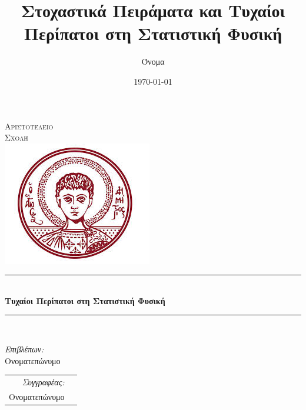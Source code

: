 \begin{titlepage}

\pagestyle{empty}
\title{Στοχαστικά Πειράματα και Τυχαίοι Περίπατοι στη Στατιστική Φυσική}
\author{Όνομα}
\date{\today}

\newcommand{\HRule}{\rule{\linewidth}{0.5mm}} %

\begin{center}
 

\textsc{Αριστοτέλειο}\\[1cm]
\textsc{Σχολή}\\[3.5cm] 

\includegraphics[scale=0.8]{figures/authsymbol.png}\\ %


\HRule \\[0.4cm]
{\Large \bfseries Τυχαίοι Περίπατοι στη Στατιστική Φυσική}\\[0.4cm] %
\HRule \\[1.5cm]
 
\end{center}

\noindent
\begin{minipage}[t]{.49\textwidth}
\raggedright
\large
\emph{Επιβλέπων:}\\
Ονοματεπώνυμο
\end{minipage}%
%
\hfill
%
\begin{minipage}[t]{.49\textwidth}
\raggedleft
\begin{tabular}[t]{@{} r l @{}}
\large
\emph{Συγγραφέας:}\\
\large
Ονοματεπώνυμο
\end{tabular}
\end{minipage}\\
\end{titlepage}
